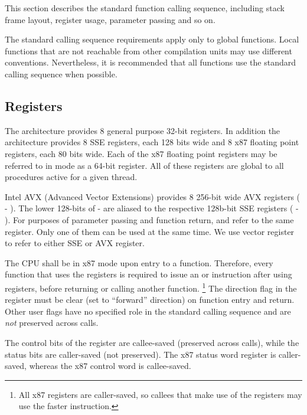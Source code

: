 This section describes the standard function calling sequence,
including stack frame layout, register usage, parameter passing and so
on.

The standard calling sequence requirements apply only to global
functions.  Local functions that are not reachable from other
compilation units may use different conventions.  Nevertheless, it is
recommended that all functions use the standard calling sequence when
possible.

\subsection{Registers}
\label{subsec-registers}

The \xARCH architecture provides 8 general purpose 32-bit registers.
In addition the architecture provides 8 SSE registers, each 128 bits
wide and 8 x87 floating point registers, each 80 bits wide.  Each of
the x87 floating point registers may be referred to in \MMX
mode as a 64-bit register.  All of these registers are global to all
procedures active for a given thread.

Intel AVX (Advanced Vector Extensions) provides 8 256-bit wide AVX registers
( - ).  The lower 128-bits of  - 
are aliased to the respective 128b-bit SSE registers ( -
). For purposes of parameter passing and function return,
 and  refer to the same register. Only one of them
can be used at the same time.  We use vector register to refer to either
SSE or AVX register.

The CPU shall be in x87 mode upon entry to a function.  Therefore,
every function that uses the \MMX registers is required to issue an
 or  instruction after using \MMX registers, before
returning or calling another function.  \footnote{All x87 registers
are caller-saved, so callees that make use of the \MMX registers may
use the faster  instruction.}  The direction flag  in the
 register must be clear (set to ``forward'' direction) on function
entry and return.  Other user flags have no specified role in the
standard calling sequence and are {\em not} preserved across calls.

The control bits of the  register are callee-saved
(preserved across calls), while the status bits are caller-saved (not
preserved).  The x87 status word register is caller-saved, whereas
the x87 control word is callee-saved.

